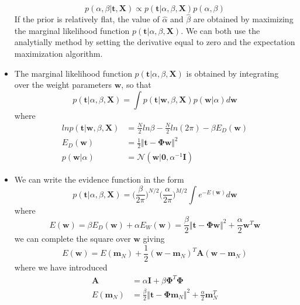 \documentclass[12pt, a4paper]{article}
\newcommand{\N}{\mathcal{N}}
\begin{document}
\begin{itemize}
        \begin{equation*}
            p(\alpha,\beta|\bm{t},\bm{X})\propto p(\bm{t}|\alpha,\beta,\bm{X})p(\alpha,\beta)
        \end{equation*}
        If the prior is relatively flat, the value of $\hat{\alpha}$ and $\hat{\beta}$ are obtained by 
        maximizing the marginal likelihood function $p(\bm{t}|\alpha,\beta,\bm{X})$. We can both use the 
        analytially method by setting the derivative equal to zero and the expectation maximization algorithm.
        \item The marginal likelihood function $p(\bm{t}|\alpha,\beta,\bm{X})$ is obtained by integrating over
        the weight parameters $\bm{w}$, so that
        \begin{equation*}
            p(\bm{t}|\alpha,\beta,\bm{X})=\int p(\bm{t}|\bm{w},\beta,\bm{X})p(\bm{w}|\alpha)d\bm{w}
        \end{equation*}
        where
        \begin{align*}
            lnp(\bm{t}|\bm{w},\beta,\bm{X})&=\frac{N}{2}ln\beta-\frac{N}{2}ln(2\pi)-\beta E_D(\bm{w})\\
            E_D(\bm{w})&=\frac{1}{2}\Vert\bm{t}-\bm{\Phi}\bm{w}\Vert^2\\
            p(\bm{w}|\alpha)&=\N(\bm{w}|\bm{0},\alpha^{-1}\bm{I})
        \end{align*}
        \item We can write the evidence function in the form 
        \begin{equation*}
            p(\bm{t}|\alpha,\beta,\bm{X})=\Big(\frac{\beta}{2\pi}\Big)^{N/2}\Big(\frac{\alpha}{2\pi}
            \Big)^{M/2}\int e^{-E(\bm{w})}d\bm{w}
        \end{equation*}
        where 
        \begin{equation*}
            E(\bm{w})=\beta E_D(\bm{w})+\alpha E_W(\bm{w})=\frac{\beta}{2}\Vert\bm{t}-\bm{\Phi}\bm{w}
            \Vert^2+\frac{\alpha}{2}\bm{w}^T\bm{w}
        \end{equation*}
        we can complete the square over $\bm{w}$ giving 
        \begin{equation*}
            E(\bm{w})=E(\bm{m}_N)+\frac{1}{2}(\bm{w}-\bm{m}_N)^T\bm{A}(\bm{w}-\bm{m}_N)
        \end{equation*}
        where we have introduced
        \begin{align*}
            \bm{A}&=\alpha\bm{I}+\beta\bm{\Phi}^T\bm{\Phi}\\
            E(\bm{m}_N)&=\frac{\beta}{2}\Vert\bm{t}-\bm{\Phi}\bm{m}_N\Vert^2+\frac{\alpha}{2}\bm{m}_N^T

\end{align*}
\end{itemize}
\end{document}
